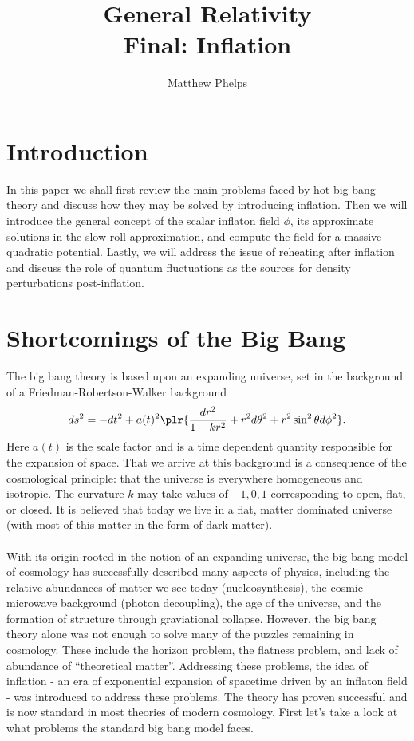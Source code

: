 \documentclass[10pt,letterpaper]{article}
\title{General Relativity\\Final: Inflation}
\author{Matthew Phelps}
\begin{document}
\maketitle
\section*{Introduction}
In this paper we shall first review the main problems faced by hot big bang theory and discuss how they may be solved by introducing inflation. Then we will introduce the general concept of the scalar inflaton field $\phi$, its approximate solutions in the slow roll approximation, and compute the field for a massive quadratic potential. Lastly, we will address the issue of reheating after inflation and discuss the role of quantum fluctuations as the sources for density perturbations post-inflation. 
\section{Shortcomings of the Big Bang}
The big bang theory is based upon an expanding universe, set in the background of a Friedman-Robertson-Walker background
\[
	ds^2 = -dt^2+a(t)^2\plr{\frac{dr^2}{1-kr^2}+r^2d\theta^2+r^2\sin^2\theta d\phi^2}.
\]
Here $a(t)$ is the scale factor and is a time dependent quantity responsible for the expansion of space. That we arrive at this background is a consequence of the cosmological principle: that the universe is everywhere homogeneous and isotropic. The curvature $k$ may take values of $-1,0,1$ corresponding to open, flat, or closed. It is believed that today we live in a flat, matter dominated universe (with most of this matter in the form of dark matter). \\ \\
With its origin rooted in the notion of an expanding universe, the big bang model of cosmology has successfully described many aspects of physics, including the relative abundances of matter we see today (nucleosynthesis), the cosmic microwave background (photon decoupling), the age of the universe, and the formation of structure through graviational collapse. However, the big bang theory alone was not enough to solve many of the puzzles remaining in cosmology. These include the horizon problem, the flatness problem, and lack of abundance of ``theoretical matter''. Addressing these problems, the idea of inflation - an era of exponential expansion of spacetime driven by an inflaton field - was introduced to address these problems. The theory has proven successful and is now standard in most theories of modern cosmology. First let's take a look at what problems the standard big bang model faces. 
\end{document}
